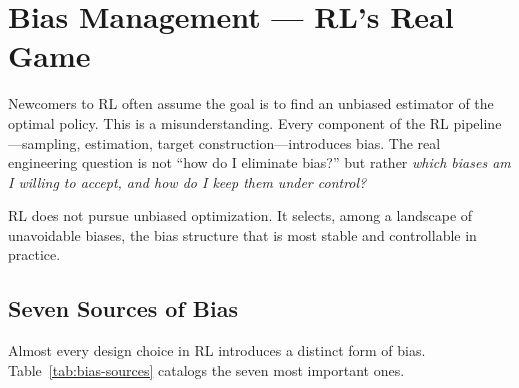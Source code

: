 \chapter{Bias Management --- RL's Real Game}
\label{ch:bias-management}

Newcomers to RL often assume the goal is to find an unbiased estimator of the
optimal policy.  This is a misunderstanding.  Every component of the RL
pipeline---sampling, estimation, target construction---introduces bias.  The
real engineering question is not ``how do I eliminate bias?'' but rather
\emph{which biases am I willing to accept, and how do I keep them under
control?}

\begin{keyidea}
RL does not pursue unbiased optimization.  It selects, among a landscape of
unavoidable biases, the bias structure that is most stable and controllable in
practice.
\end{keyidea}


\section{Seven Sources of Bias}
\label{sec:seven-biases}

Almost every design choice in RL introduces a distinct form of bias.
Table~\ref{tab:bias-sources} catalogs the seven most important ones.

